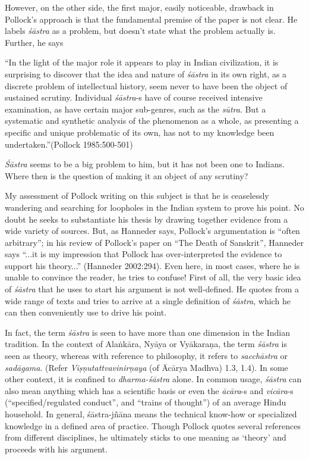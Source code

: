 However, on the other side, the first major, easily noticeable, drawback in Pollock's approach is that the fundamental premise of the paper is not clear. He labels {\it śāstra} as a problem, but doesn't state what the problem actually is. Further, he says
\begin{myquote}
``In the light of the major role it appears to play in Indian civilization, it is surprising to discover that the idea and nature of {\sl śāstra} in its own right, as a discrete problem of intellectual history, seem never to have been the object of sustained scrutiny. Individual {\sl śāstra}-s have of course received intensive examination, as have certain major sub-genres, such as the {\sl sūtra}. But a systematic and synthetic analysis of the phenomenon as a whole, as presenting a specific and unique problematic of its own, has not to my knowledge been undertaken.''\hfill (Pollock 1985:500-501)
\end{myquote}

{\sl Śāstra} seems to be a big problem to him, but it has not been one to Indians. Where then is the question of making it an object of any scrutiny? 

My assessment of Pollock writing on this subject is that he is ceaselessly wandering and searching for loopholes in the Indian system to prove his point. No doubt he seeks to substantiate his thesis by drawing together evidence from a wide variety of sources. But, as Hanneder says, Pollock's argumentation is ``often arbitrary''; in his review of Pollock's paper on ``The Death of Sanskrit'', Hanneder says ``...it is my impression that Pollock has over-interpreted the evidence to support his theory...'' (Hanneder 2002:294). Even here, in most cases, where he is unable to convince the reader, he tries to confuse! First of all, the very basic idea of {\it śāstra} that he uses to start his argument is not well-defined. He quotes from a wide range of texts and tries to arrive at a single definition of {\it śāstra}, which he can then conveniently use to drive his point. 

In fact, the term {\it śāstra} is seen to have more than one dimension in the Indian tradition. In the context of Alaṅkāra, Nyāya or Vyākaraṇa, the term {\it śāstra} is seen as theory, whereas with reference to philosophy, it refers to {\it sacchāstra} or {\it sadāgama}. (Refer {\it Viṣṇutattvavinirṇaya} (of Ācārya Madhva) 1.3, 1.4).  In some other context, it is confined to {\it dharma-śāstra} alone. In common usage, {\it śāstra} can also mean anything which has a scientific basis or even the {\it ācāra}-s and {\it vicāra}-s (``specified/regulated conduct'', and ``trains of thought'') of an average Hindu household. In general,  śāstra-jñāna means the technical know-how or specialized knowledge in a defined area of practice. Though Pollock quotes several references from different disciplines, he ultimately sticks to one meaning as `theory' and proceeds with his argument. 

